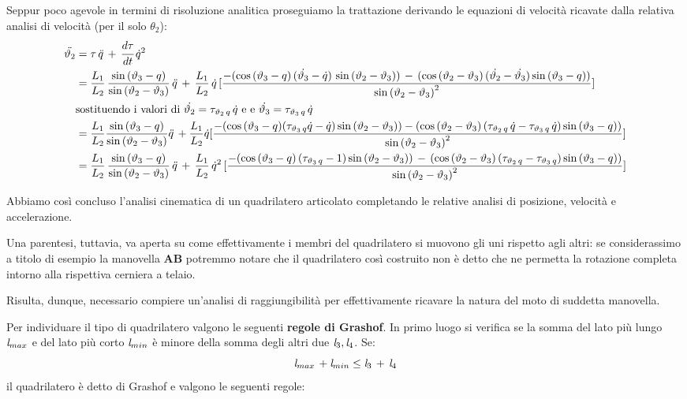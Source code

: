 	Seppur poco agevole in termini di risoluzione analitica proseguiamo la trattazione derivando le equazioni di velocità ricavate dalla relativa analisi di velocità (per il solo $\theta_2$):
	\begin{align*}
	\ddot{\vartheta_2} &= \tau\,\ddot{q}\,+\,\cfrac{d\tau}{dt}\,\dot{q}^2\\
	&= \frac{L_1}{L_2}\,\frac{\sin{(\vartheta_3-q)}}{\sin{(\vartheta_2-\vartheta_3)}}\,\ddot{q}\,+\,\frac{L_1}{L_2}\,\dot{q}\,[\frac{-(\cos{(\vartheta_3-q)}\,(\dot{\vartheta_3}-\dot{q})\,\sin{(\vartheta_2-\vartheta_3)})\,-\,(\cos{(\vartheta_2-\vartheta_3)}\,(\dot{\vartheta_2}-\dot{\vartheta_3})\sin{(\vartheta_3-q)})}{\sin{(\vartheta_2-\vartheta_3)}^2}]\\
	& \text{sostituendo i valori di $\dot{\vartheta_2}= \tau_{\vartheta_2\,q}\,\dot{q}$ e e $\dot{\vartheta_3}=\tau_{\vartheta_3\,q}\,\dot{q}$}\\
	&=  \frac{L_1}{L_2}\frac{\sin{(\vartheta_3-q)}}{\sin{(\vartheta_2-\vartheta_3)}}\ddot{q}\,+\frac{L_1}{L_2}\dot{q}[\frac{-(\cos{(\vartheta_3-q)}(\tau_{\vartheta_3\,q}\dot{q}-\dot{q})\sin{(\vartheta_2-\vartheta_3)})-(\cos{(\vartheta_2-\vartheta_3)}\,(\tau_{\vartheta_2\,q}\,\dot{q}-\tau_{\vartheta_3\,q}\,\dot{q})\sin{(\vartheta_3-q)})}{\sin{(\vartheta_2-\vartheta_3)}^2}]\\
	&=  \frac{L_1}{L_2}\,\frac{\sin{(\vartheta_3-q)}}{\sin{(\vartheta_2-\vartheta_3)}}\,\ddot{q}\,+\,\frac{L_1}{L_2}\,\dot{q}^2\,[\frac{-(\cos{(\vartheta_3-q)}\,(\tau_{\vartheta_3\,q}-1)\sin{(\vartheta_2-\vartheta_3)})\,-\,(\cos{(\vartheta_2-\vartheta_3)}\,(\tau_{\vartheta_2\,q}-\tau_{\vartheta_3\,q})\sin{(\vartheta_3-q)})}{\sin{(\vartheta_2-\vartheta_3)}^2}]
	\end{align*}
	
Abbiamo così concluso l'analisi cinematica di un quadrilatero articolato completando le relative analisi di posizione, velocità e accelerazione.

Una parentesi, tuttavia, va aperta su come effettivamente i membri del quadrilatero si muovono gli uni rispetto agli altri: se considerassimo a titolo di esempio la manovella $\mathbf{AB}$ potremmo notare che il quadrilatero così costruito non è detto che ne permetta la rotazione completa intorno alla rispettiva cerniera a telaio.

Risulta, dunque, necessario compiere un'analisi di raggiungibilità per effettivamente ricavare la natura del moto di suddetta manovella.

Per individuare il tipo di quadrilatero valgono le seguenti \textbf{regole di Grashof}. In primo luogo si verifica se la somma del lato più lungo $\emph{l}_{max}$ e del lato più corto $\emph{l}_{min}$ è minore della somma degli altri due $\emph{l}_3, \emph{l}_4$. Se:
\[\emph{l}_{max}\,+\emph{l}_{min} \le \emph{l}_3\,+\,\emph{l}_4\]
il quadrilatero è detto di Grashof e valgono le seguenti regole:

